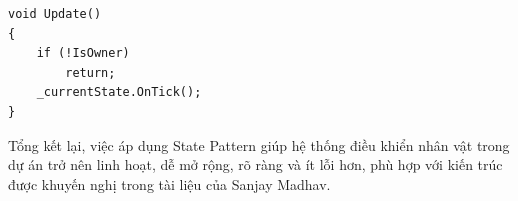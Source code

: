 \begin{lstlisting}[style=csharpstyle, caption={Hàm Update trong game loop}]
void Update()
{
    if (!IsOwner)
        return;
    _currentState.OnTick();
}
\end{lstlisting}

Tổng kết lại, việc áp dụng State Pattern giúp hệ thống điều khiển nhân vật trong dự án trở nên linh hoạt, dễ mở rộng, rõ ràng và ít lỗi hơn, phù hợp với kiến trúc được khuyến nghị trong tài liệu của Sanjay Madhav.



